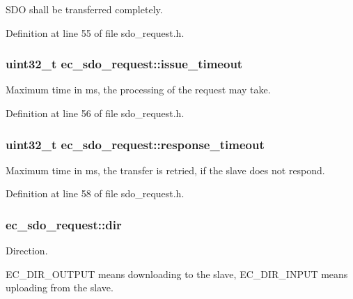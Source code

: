 \-S\-D\-O shall be transferred completely. 



\-Definition at line 55 of file sdo\-\_\-request.\-h.

\subsubsection[{issue\-\_\-timeout}]{\setlength{\rightskip}{0pt plus 5cm}uint32\-\_\-t {\bf ec\-\_\-sdo\-\_\-request\-::issue\-\_\-timeout}}\label{structec__sdo__request_a042249b5e1776a0c0b6fc3003ef939a2}


\-Maximum time in ms, the processing of the request may take. 



\-Definition at line 56 of file sdo\-\_\-request.\-h.

\subsubsection[{response\-\_\-timeout}]{\setlength{\rightskip}{0pt plus 5cm}uint32\-\_\-t {\bf ec\-\_\-sdo\-\_\-request\-::response\-\_\-timeout}}\label{structec__sdo__request_a0282ca505cf8acbbe9ecbbd1999967a9}


\-Maximum time in ms, the transfer is retried, if the slave does not respond. 



\-Definition at line 58 of file sdo\-\_\-request.\-h.

\subsubsection[{dir}]{ {\bf ec\-\_\-sdo\-\_\-request\-::dir}}\label{structec__sdo__request_aaccb8ada520d7948b4f61653df6e871f}


\-Direction. 

\-E\-C\-\_\-\-D\-I\-R\-\_\-\-O\-U\-T\-P\-U\-T means downloading to the slave, \-E\-C\-\_\-\-D\-I\-R\-\_\-\-I\-N\-P\-U\-T means uploading from the slave. 

